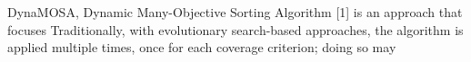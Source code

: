 DynaMOSA, Dynamic Many-Objective Sorting Algorithm [1] is an approach that focuses 
Traditionally, with evolutionary search-based approaches, the algorithm is applied multiple times, 
once for each coverage criterion; doing so may 